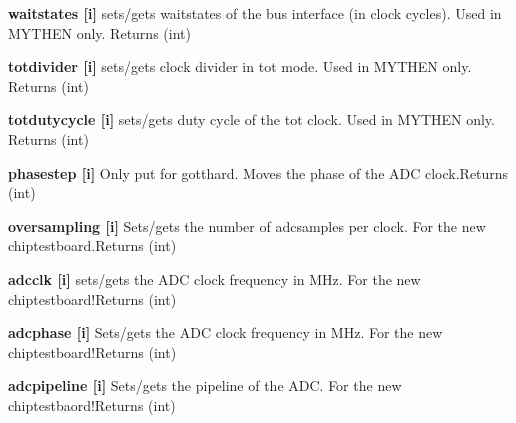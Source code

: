 \begin{DoxyItemize}
\item {\bfseries waitstates \mbox{[}i\mbox{]}} sets/gets waitstates of the bus interface (in clock cycles). Used in MYTHEN only. {\ttfamily Returns} {\ttfamily }(int)
\end{DoxyItemize}


\begin{DoxyItemize}
\item {\bfseries totdivider \mbox{[}i\mbox{]}} sets/gets clock divider in tot mode. Used in MYTHEN only. {\ttfamily Returns} {\ttfamily }(int)
\end{DoxyItemize}


\begin{DoxyItemize}
\item {\bfseries totdutycycle \mbox{[}i\mbox{]}} sets/gets duty cycle of the tot clock. Used in MYTHEN only. {\ttfamily Returns} {\ttfamily }(int)
\end{DoxyItemize}


\begin{DoxyItemize}
\item {\bfseries phasestep \mbox{[}i\mbox{]}} Only put for gotthard. Moves the phase of the ADC clock.{\ttfamily Returns} {\ttfamily }(int)
\end{DoxyItemize}


\begin{DoxyItemize}
\item {\bfseries oversampling \mbox{[}i\mbox{]}} Sets/gets the number of adcsamples per clock. For the new chiptestboard.{\ttfamily Returns} {\ttfamily }(int)
\end{DoxyItemize}


\begin{DoxyItemize}
\item {\bfseries adcclk \mbox{[}i\mbox{]}} sets/gets the ADC clock frequency in MHz. For the new chiptestboard!{\ttfamily Returns} {\ttfamily }(int)
\end{DoxyItemize}


\begin{DoxyItemize}
\item {\bfseries adcphase \mbox{[}i\mbox{]}} Sets/gets the ADC clock frequency in MHz. For the new chiptestboard!{\ttfamily Returns} {\ttfamily }(int)
\end{DoxyItemize}


\begin{DoxyItemize}
\item {\bfseries adcpipeline \mbox{[}i\mbox{]}} Sets/gets the pipeline of the ADC. For the new chiptestbaord!{\ttfamily Returns} {\ttfamily }(int)
\end{DoxyItemize}


